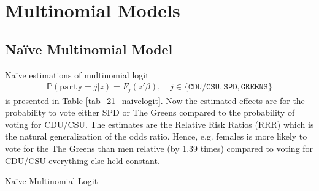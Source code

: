 \section{Multinomial Models}

    \subsection{Naïve Multinomial Model}
        Naïve estimations of multinomial logit
        \begin{align}
            \mathbb{P}(\texttt{party} = j\vert z) = F_j(z'\beta), \quad j \in \{\texttt{CDU}/\texttt{CSU}, \texttt{SPD}, \texttt{GREENS} \}
            \label{multi_model_1}
        \end{align}
        is presented in Table \ref{tab_21_naivelogit}. Now the estimated effects are for the probability to vote either SPD or The Greens compared to the probability of voting for CDU/CSU. The estimates are the Relative Risk Ratios (RRR) which is the natural generalization of the odds ratio. Hence, e.g. females is more likely to vote for the The Greens than men relative (by 1.39 times) compared to voting for CDU/CSU everything else held constant.
        \begin{samepage}
                \begin{table}[]
                    \footnotesize
                    \centering
                    
                    \caption{Naïve Multinomial Logit}
                    \label{tab_21_naivelogit}
                \end{table}
            \end{samepage}
    
